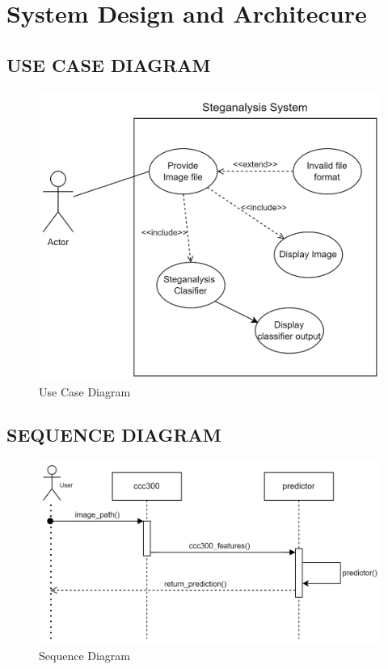 \chapter{System Design and Architecure}
\section{USE CASE DIAGRAM}
\begin{figure}[H]
    \centering
    \includegraphics[width=120mm]{./img/useCase.png}
    \caption{Use Case Diagram}
\end{figure}
\section{SEQUENCE DIAGRAM}
\begin{figure}[H]
    \centering
    \includegraphics[width=120mm]{./img/sequenceDiagram.png}
    \caption{Sequence Diagram}
\end{figure}
